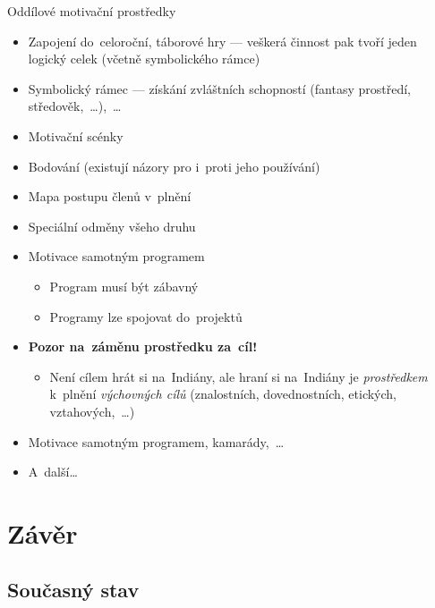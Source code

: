 \documentclass[compress, xelatex, 11pt, xcolor=dvipsnames, print, aspectratio=169,
	hyperref={
		bookmarks=true,
		unicode=true,
		colorlinks=true,
		pdftitle={Skautska vychovna metoda},
		plainpages=false,
		pdfauthor={Vojtech Zeisek},
		pdfsubject={Skautska vychovna metoda a jeji vyvoj za posledni stoleti a desetileti},
		pdfcreator={XeLaTeX},
		pdfkeywords={Junak, Pedagogika, Skaut, Skauting, Vychovna metoda},
		linkcolor=Red, %
		anchorcolor=ForestGreen, %
		citecolor=ForestGreen, %
		filecolor=ForestGreen, %
		menucolor=ForestGreen, %
		urlcolor=Sepia, %
		pdftex},
	url={hyphens, lowtilde} %
	]{beamer}
\begin{document}
\begin{frame}{Oddílové motivační prostředky}
	\begin{itemize}
		\item Zapojení do~celoroční, táborové hry --- veškerá činnost pak tvoří jeden logický celek (včetně symbolického rámce)
		\item Symbolický rámec --- získání zvláštních schopností (fantasy prostředí, středověk,~\ldots),~\ldots
		\item Motivační scénky
		\item Bodování (existují názory pro i~proti jeho používání)
		\item Mapa postupu členů v~plnění
		\item Speciální odměny všeho druhu
		\item Motivace samotným programem
		\begin{itemize}
			\item Program musí být zábavný
			\item Programy lze spojovat do~projektů
		\end{itemize}
		\item \textbf{Pozor na~záměnu prostředku za~cíl!}
		\begin{itemize}
			\item Není cílem hrát si na~Indiány, ale hraní si na~Indiány je \textit{prostředkem} k~plnění \textit{výchovných cílů} (znalostních, dovednostních, etických, vztahových,~\ldots)
		\end{itemize}
		\item Motivace samotným programem, kamarády,~\ldots
		\item A~další\ldots
	\end{itemize}
\end{frame}

\section{Závěr}

\subsection{Současný stav}
\end{document}
